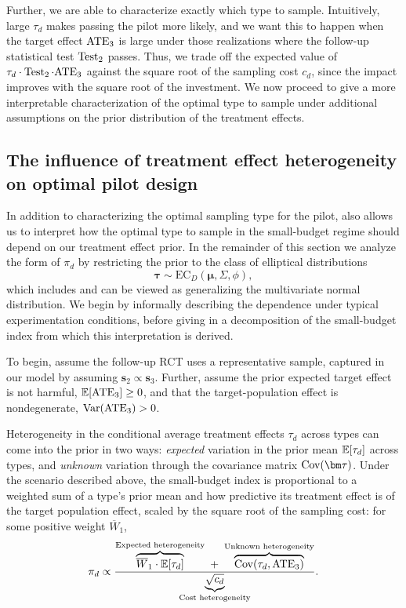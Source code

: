 Further, we are able to characterize exactly which type to sample.
Intuitively, large $\tau_d$ makes passing the pilot more likely, and we want this to happen when the target effect $\mathrm{ATE}_3$ is large under those realizations where the follow-up statistical test $\operatorname{Test}_2$ passes.
Thus, we trade off the expected value of $\tau_d \cdot \operatorname{Test}_2 \cdot \mathrm{ATE}_3$ against the square root of the sampling cost $c_d$, since the impact improves with the square root of the investment.
We now proceed to give a more interpretable characterization of the optimal type to sample under additional assumptions on the prior distribution of the treatment effects.

\subsection{The influence of treatment effect heterogeneity on
optimal pilot design}
\label{sec:small-budget-heterogeneity}

In addition to characterizing the optimal sampling type for the pilot,  also allows us to interpret how the optimal type to sample in the small-budget regime should depend on our treatment effect prior.
In the remainder of this section we analyze the form of $\pi_d$ by restricting the prior to the class of elliptical distributions~\cite{FangKo90}
\[
  \bm{\tau}\sim\mathrm{EC}_D(\bm{\mu},\Sigma,\phi),
\]
which includes and can be viewed as generalizing the multivariate normal distribution.
We begin by informally describing the dependence under typical experimentation conditions, before giving in  a decomposition of the small-budget index from which this interpretation is derived.

To begin, assume the follow-up RCT uses a representative sample, captured in our model by assuming $\bm{s}_2\propto \bm{s}_3$.
Further, assume the prior expected target effect is not harmful, $\mathbb{E}[\mathrm{ATE}_3]\ge 0$, and that the target-population effect is nondegenerate, ${\rm Var}(\mathrm{ATE}_3)>0$.

Heterogeneity in the conditional average treatment effects $\tau_d$ across types can come into the prior in two ways: \emph{expected} variation in the prior mean $\mathbb{E}[\tau_d]$ across types, and \emph{unknown} variation through the covariance matrix $\cov(\bm\tau)$.
Under the scenario described above, the small-budget index is proportional to a weighted sum of a type's prior mean and how predictive its treatment effect is of the target population effect, scaled by the square root of the sampling cost: for some positive weight $\overline W_1$,
\vspace{0.3cm}
\begin{equation}
  \idx_d \propto \frac{\overbrace{\overline W_1 \cdot \E[\tau_d]}^{\text{Expected
    heterogeneity}} \ + \
    \overbrace{\cov(\tau_d, \ATE_3)}^{\text{Unknown heterogeneity}}
  }{\underbrace{\sqrt{c_d}}_{\text{Cost heterogeneity}}}.
  \label{eq:small-budget-index-interpretation-special-case}
\end{equation}
\vspace{0.3cm}

